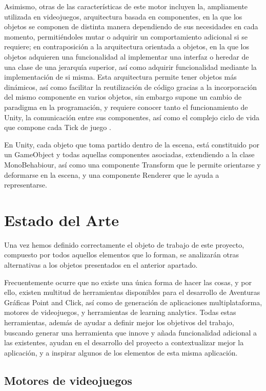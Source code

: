 Asimismo, otras de las características de este motor incluyen la, ampliamente utilizada en videojuegos, arquitectura basada en componentes, en la que los objetos se componen de distinta manera dependiendo de sus necesidades en cada momento, permitiéndoles mutar o adquirir un comportamiento adicional si se requiere; en contraposición a la arquitectura orientada a objetos, en la que los objetos adquieren una funcionalidad al implementar una interfaz o heredar de una clase de una jerarquía superior, así como adquirir funcionalidad mediante la implementación de si misma. Esta arquitectura permite tener objetos más dinámicos, así como facilitar la reutilización de código gracias a la incorporación del mismo componente en varios objetos, sin embargo supone un cambio de paradigma en la programación, y requiere conocer tanto el funcionamiento de Unity, la comunicación entre sus componentes, así como el complejo ciclo de vida que compone cada Tick de juego \cite{unitymanual}.

En Unity, cada objeto que toma partido dentro de la escena, está constituido por un GameObject y todas aquellas componentes asociadas, extendiendo a la clase MonoBehabiour, así como una componente Transform que le permite orientarse y deformarse en la escena, y una componente Renderer que le ayuda a representarse.

\section{Estado del Arte}
\label{estadodelarte}

Una vez hemos definido correctamente el objeto de trabajo de este proyecto, compuesto por todos aquellos elementos que lo forman, se analizarán otras alternativas a los objetos presentados en el anterior apartado. 

Frecuentemente ocurre que no existe una única forma de hacer las cosas, y por ello, existen multitud de herramientas disponibles para el desarrollo de Aventuras Gráficas Point and Click, así como de generación de aplicaciones multiplataforma, motores de videojuegos, y herramientas de learning analytics. Todas estas herramientas, además de ayudar a definir mejor los objetivos del trabajo, buscando generar una herramienta que innove y añada funcionalidad adicional a las existentes, ayudan en el desarrollo del proyecto a contextualizar mejor la aplicación, y a inspirar algunos de los elementos de esta misma aplicación.

\subsection{Motores de videojuegos}
\label{motoresdevideojuegos}

